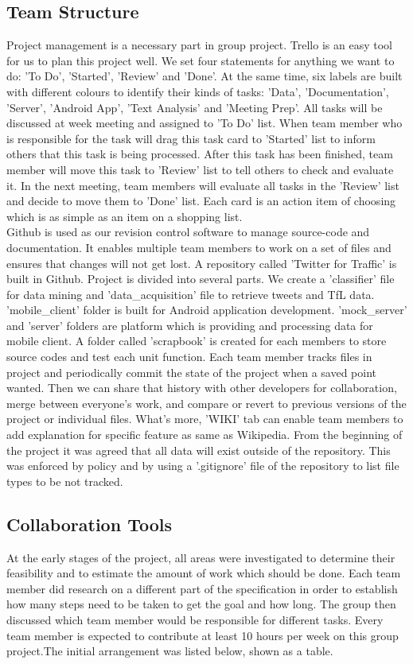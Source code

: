 \subsection{Team Structure}
Project management is a necessary part in group project. Trello is an easy tool for us to plan this project well. We set four statements for anything we want to do: 'To Do', 'Started', 'Review' and 'Done'. At the same time, six labels are built with different colours to identify their kinds of tasks: 'Data', 'Documentation', 'Server', 'Android App', 'Text Analysis' and 'Meeting Prep'. All tasks will be discussed at week meeting and assigned to 'To Do' list. When team member who is responsible for the task will drag this task card to 'Started' list to inform others that this task is being processed. After this task has been finished, team member will move this task to 'Review' list to tell others to check and evaluate it. In the next meeting, team members will evaluate all tasks in the 'Review' list and decide to move them to 'Done' list. Each card is an action item of choosing which is as simple as an item on a shopping list.\\
Github is used as our revision control software to manage source-code and documentation. It enables multiple team members to work on a set of files and ensures that changes will not get lost. A repository called 'Twitter for Traffic' is built in Github. Project is divided into several parts. We create a 'classifier' file for data mining and 'data\_acquisition' file to retrieve tweets and TfL data. 'mobile\_client' folder is built for Android application development. 'mock\_server' and 'server' folders are platform which is providing and processing data for mobile client. A folder called 'scrapbook' is created for each members to store source codes and test each unit function. Each team member tracks files in project and periodically commit the state of the project when a saved point wanted. Then we can share that history with other developers for collaboration, merge between everyone's work, and compare or revert to previous versions of the project or individual files. What's more, 'WIKI' tab can enable team members to add explanation for specific feature as same as Wikipedia. From the beginning of the project it was agreed that all data will exist outside of the repository. This was enforced by policy and by using a '.gitignore' file of the repository to list file types to be not tracked.
\subsection{Collaboration Tools}
At the early stages of the project, all areas were investigated to determine their feasibility and to estimate the amount of work which should be done. Each team member did research on a different part of the specification in order to establish how many steps need to be taken to get the goal and how long. The group then discussed which team member would be responsible for different tasks. Every team member is expected to contribute at least 10 hours per week on this group project.The initial arrangement was listed below, shown as a table.\\
